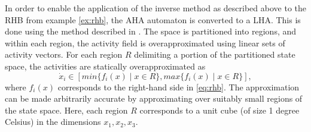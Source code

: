 \documentclass{llncs}
\begin{document}

\begin{example} \label{ex:rhb2}
  In order to enable the application of the inverse method as
  described above to the RHB from example \ref{ex:rhb}, the AHA
  automaton is converted to a LHA.  This is done using the 
method described in \cite{Fre:2008}. 
The space
  is partitioned into regions, and within each region, the activity
  field is overapproximated using linear sets of activity vectors.
  For each region $R$ delimiting a portion of the partitioned state
  space, the activities are statically overapproximated as
  \begin{equation*}
   \dot{x}_i \in \left[ min \{f_i(x) \mid x \in R \}, max \{f_i(x) \mid x \in R \} \right],
 \end{equation*}
  where $f_i(x)$ corresponds to the right-hand side in \eqref{eq:rhb}.
  The approximation can be made arbitrarily accurate by approximating
  over suitably small regions of the state space. Here, each region
  $R$ corresponds to a unit cube (of size 1 degree Celsius) in the
  dimensions $x_1,x_2,x_3$.


\end{example}
\end{document}
